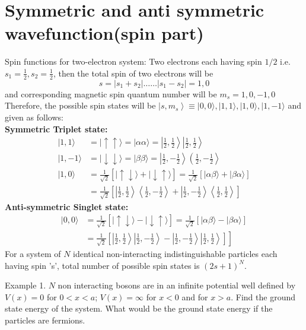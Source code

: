 \section{Symmetric and anti symmetric wavefunction(spin part)}
Spin functions for two-electron system:
Two electrons each having spin $1 / 2$ i.e. $s_{1}=\frac{1}{2}, s_{2}=\frac{1}{2}$, then the total spin of two electrons will be
$$
s=\left|s_{1}+s_{2}\right| \ldots \ldots\left|s_{1}-s_{2}\right|=1,0
$$
and corresponding magnetic spin quantum number will be $m_{s}=1,0,-1,0$
Therefore, the possible spin states will be $\left|s, m_{s}\right\rangle \equiv|0,0\rangle,|1,1\rangle,|1,0\rangle,|1,-1\rangle$ and given as follows:\\
\textbf{Symmetric Triplet state:}\\
$$
\begin{aligned}
|1,1\rangle &=|\uparrow \uparrow\rangle=|\alpha \alpha\rangle=\left|\frac{1}{2}, \frac{1}{2}\right\rangle\left|\frac{1}{2}, \frac{1}{2}\right\rangle \\
|1,-1\rangle &=|\downarrow \downarrow\rangle=|\beta \beta\rangle=\left|\frac{1}{2},-\frac{1}{2}\right\rangle\left(\frac{1}{2},-\frac{1}{2}\right\rangle \\
|1,0\rangle &=\frac{1}{\sqrt{2}}[|\uparrow \downarrow\rangle+|\downarrow \uparrow\rangle]=\frac{1}{\sqrt{2}}[|\alpha \beta\rangle+|\beta \alpha\rangle] \\
&=\frac{1}{\sqrt{2}}\left[\left|\frac{1}{2}, \frac{1}{2}\right\rangle\left\langle\frac{1}{2},-\frac{1}{2}\right\rangle+\left|\frac{1}{2},-\frac{1}{2}\right\rangle\left\langle\frac{1}{2}, \frac{1}{2}\right\rangle\right]
\end{aligned}
$$
\textbf{Anti-symmetric Singlet state:}
$$
\begin{aligned}
|0,0\rangle &=\frac{1}{\sqrt{2}}[|\uparrow \downarrow\rangle-|\downarrow \uparrow\rangle]=\frac{1}{\sqrt{2}}[|\alpha \beta\rangle-|\beta \alpha\rangle] \\
&\left.=\frac{1}{\sqrt{2}}\left[\left|\frac{1}{2}, \frac{1}{2}\right\rangle\left|\frac{1}{2},-\frac{1}{2}\right\rangle-\left|\frac{1}{2},-\frac{1}{2}\right\rangle\left|\frac{1}{2}, \frac{1}{2}\right\rangle\right]\right]
\end{aligned}
$$
For a system of $N$ identical non-interacting indistinguishable particles each having spin 's', total number of possible spin states is $(2 s+1)^{N}$.
\begin{exercise}
Example 1. $N$ non interacting bosons are in an infinite potential well defined by $V(x)=0$ for $0<x<a$; $V(x)=\infty$ for $x<0$ and for $x>a$. Find the ground state energy of the system. What would be the ground state energy if the particles are fermions.
	\end{exercise}
